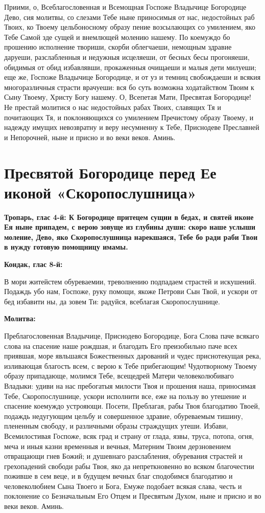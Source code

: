 Приими, о, Всеблагословенная и Всемощная Госпоже Владычице Богородице Дево, сия молитвы, со слезами Тебе ныне приносимыя от нас, недостойных раб Твоих, ко Твоему цельбоносному образу пение возсылающих со умилением, яко Тебе Самой зде сущей и внемлющей молению нашему. По коемуждо бо прошению исполнение твориши, скорби облегчаеши, немощным здравие даруеши, разслабленныя и недужныя исцеляеши, от бесных бесы прогоняеши, обидимыя от обид избавлявши, прокаженныя очищаеши и малыя дети милуеши; еще же, Госпоже Владычице Богородице, и от уз и темниц свобождаеши и всякия многоразличныя страсти врачуеши: вся бо суть возможна ходатайством Твоим к Сыну Твоему, Христу Богу нашему. О, Всепетая Мати, Пресвятая Богородице! Не престай молитися о нас недостойных рабах Твоих, славящих Тя и почитающих Тя, и поклоняющихся со умилением Пречистому образу Твоему, и надежду имущих невозвратну и веру несумненну к Тебе, Приснодеве Преславней и Непорочней, ныне и присно и во веки веков. Аминь.


\section{Пресвятой Богородице перед Ее иконой «Скоропослушница»}
 
\bfseries Тропарь, глас 4-й:\normalfont{}
К Богородице притецем сущии в бедах, и святей иконе Ея ныне припадем, с верою зовуще из глубины души: скоро наше услыши моление, Дево, яко Скоропослушница нарекшаяся, Тебе бо ради раби Твои в нужду готовую помощницу имамы.


\medskip
\bfseries Кондак, глас 8-й:\normalfont{}


В мори житейстем обуреваемии, треволнению подпадаем страстей и искушений. Подаждь убо нам, Госпоже, руку помощи, якоже Петрови Сын Твой, и ускори от бед избавити ны, да зовем Ти: радуйся, всеблагая Скоропослушнице.


\medskip
\bfseries Молитва:\normalfont{}


Преблагословенная Владычице, Приснодево Богородице, Бога Слова паче всякаго слова на спасение наше рождшая, и благодать Его преизобильно паче всех приявшая, море явльшаяся Божественных дарований и чудес приснотекущая река, изливающая благость всем, с верою к Тебе прибегающим! Чудотворному Твоему образу припадающе, молимся Тебе, всещедрей Матери человеколюбиваго Владыки: удиви на нас пребогатыя милости Твоя и прошения наша, приносимая Тебе, Скоропослушнице, ускори исполнити все, еже на пользу во утешение и спасение коемуждо устрояющи. Посети, Преблагая, рабы Твоя благодатию Твоей, подаждь недугующим цельбу и совершенное здравие, обуреваемым тишину, плененным свободу, и различными образы страждущих утеши. Избави, Всемилостивая Госпоже, всяк град и страну от глада, язвы, труса, потопа, огня, меча и иныя казни временныя и вечныя, Матерним Твоим дерзновением отвращающи гнев Божий; и душевнаго разслабления, обуревания страстей и грехопадений свободи рабы Твоя, яко да непреткновенно во всяком благочестии поживше в сем веце, и в будущем вечных благ сподобимся благодатию и человеколюбием Сына Твоего и Бога, Емуже подобает всякая слава, честь и поклонение со Безначальным Его Отцем и Пресвятым Духом, ныне и присно и во веки веков. Аминь.

